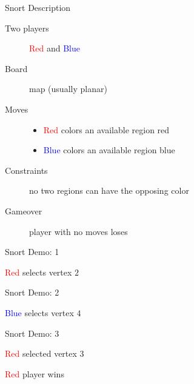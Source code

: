 \documentclass[mathserif]{beamer}
\newcommand{\rplayer}{\textcolor{red}{Red }}
\newcommand{\bplayer}{\textcolor{blue}{Blue }}
\begin{document}
\begin{frame}{Snort Description}
	\begin{description}
		\item [Two players] \rplayer and \bplayer
		\item [Board] map (usually planar)
		\item [Moves]
			\begin{itemize}
				\item \rplayer colors an available region red
				\item \bplayer colors an available region blue
			\end{itemize}
		\item [Constraints] no two regions can have the opposing color
		\item [Gameover] player with no moves loses
	\end{description}

	\vfill
	\pause
	\begin{figure}[h]
		\centering
		\begin{tikzpicture}
			
		\end{tikzpicture}
	\end{figure}
\end{frame}

\begin{frame}{Snort Demo: 1}
	\begin{figure}[h]
		\centering
		\begin{tikzpicture}
			
		\end{tikzpicture}
	\end{figure}
	\vfill
	\begin{center}
		\rplayer selects vertex $2$
	\end{center}
\end{frame}

\begin{frame}{Snort Demo: 2}
	\begin{figure}[h]
		\centering
		\begin{tikzpicture}
			
		\end{tikzpicture}
	\end{figure}
	\vfill
	\begin{center}
		\bplayer selects vertex $4$
	\end{center}
\end{frame}

\begin{frame}{Snort Demo: 3}
	\begin{figure}[h]
		\centering
		\begin{tikzpicture}
			
		\end{tikzpicture}
	\end{figure}
	\vfill
	\begin{center}
		\rplayer selected vertex $3$
	\end{center}
	\begin{center}
		\rplayer player wins
	\end{center}
\end{frame}
\end{document}
